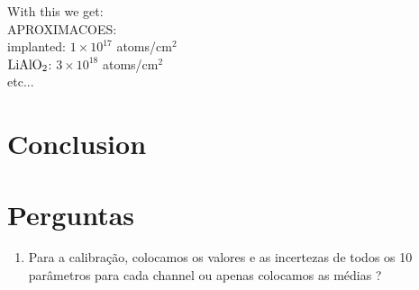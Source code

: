 \documentclass{article}
\begin{document}
\begin{multicols}{2}
With this we get:\\
APROXIMACOES:\\
implanted: $1\times10^{17}$ atoms/cm$^2$\\
$\ce{LiAlO2}$: $3\times10^{18}$ atoms/cm$^2$\\
etc...\\

\section{Conclusion}

\section{Perguntas}

\begin{enumerate}
    \item Para a calibração, colocamos os valores e as incertezas de todos os 10 parâmetros para cada channel ou apenas colocamos as médias ?
\end{enumerate}

\section{}


\printbibliography
\nocite{*}

\end{multicols}
\end{document}
